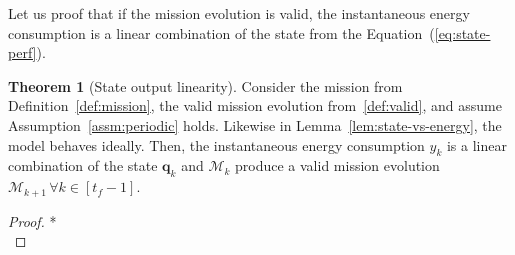 \documentclass[letterpaper,10pt,conference]{ieeeconf}
\theoremstyle{definition}
\newtheorem{thm}{Theorem}[section]
\begin{document}
Let us proof that if the mission evolution is valid, the instantaneous energy consumption is a linear combination of the state from the Equation~(\ref{eq:state-perf}).

\begin{thm}[State output linearity]\label{thm:state-vs-energy}
  Consider the mission from Definition~\ref{def:mission}, the valid mission evolution from~\ref{def:valid}, and assume Assumption~\ref{assm:periodic} holds. Likewise in Lemma~\ref{lem:state-vs-energy}, the model behaves ideally. 
  Then, the instantaneous energy consumption $y_k$ is a linear combination of the state $\mathbf{q}_k$ and $\mathcal{M}_k$ produce a valid mission evolution $\mathcal{M}_{k+1}\,\forall k\in[t_f-1]$.
\end{thm}
\begin{proof}
  *\\
\end{proof}



\end{document}

